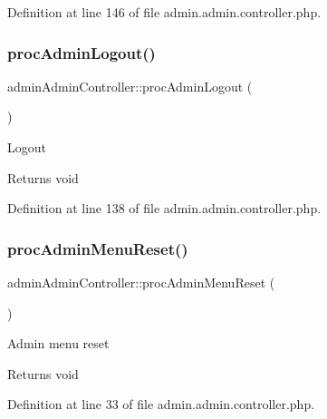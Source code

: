Definition at line 146 of file admin.\+admin.\+controller.\+php.

\hypertarget{classadminAdminController_af49660a64f4b64c0b2f0801f4742abd1}{}\label{classadminAdminController_af49660a64f4b64c0b2f0801f4742abd1} 
\subsubsection{\texorpdfstring{proc\+Admin\+Logout()}{procAdminLogout()}}
{\footnotesize\ttfamily admin\+Admin\+Controller\+::proc\+Admin\+Logout (\begin{DoxyParamCaption}{ }\end{DoxyParamCaption})}

Logout \begin{DoxyReturn}{Returns}
void 
\end{DoxyReturn}


Definition at line 138 of file admin.\+admin.\+controller.\+php.

\hypertarget{classadminAdminController_a0ba2a344a960ba3fa385f8450233cd32}{}\label{classadminAdminController_a0ba2a344a960ba3fa385f8450233cd32} 
\subsubsection{\texorpdfstring{proc\+Admin\+Menu\+Reset()}{procAdminMenuReset()}}
{\footnotesize\ttfamily admin\+Admin\+Controller\+::proc\+Admin\+Menu\+Reset (\begin{DoxyParamCaption}{ }\end{DoxyParamCaption})}

Admin menu reset \begin{DoxyReturn}{Returns}
void 
\end{DoxyReturn}


Definition at line 33 of file admin.\+admin.\+controller.\+php.

\hypertarget{classadminAdminController_a15f6aab1393b491c9f754af46929fee7}{}\label{classadminAdminController_a15f6aab1393b491c9f754af46929fee7} 

